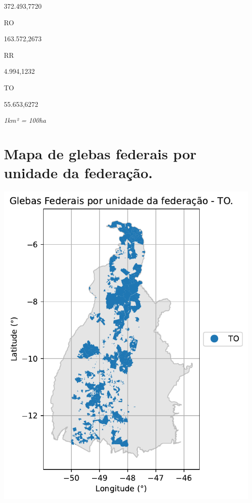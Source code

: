\documentclass[
  letterpaper,
]{report}
\begin{document}
372.493,7720

\n    

\n    

\n      

RO

\n      

163.572,2673

\n    

\n    

\n      

RR

\n      

4.994,1232

\n    

\n    

\n      

TO

\n      

55.653,6272

\n    

\n  

\n

\emph{1km² = 100ha}

\hypertarget{mapa-de-glebas-federais-por-unidade-da-federauxe7uxe3o.}{%
\section{Mapa de glebas federais por unidade da
federação.}\label{mapa-de-glebas-federais-por-unidade-da-federauxe7uxe3o.}}

\includegraphics{./5-delimitacao_files/figure-pdf/cell-6-output-1.pdf}
\end{document}

